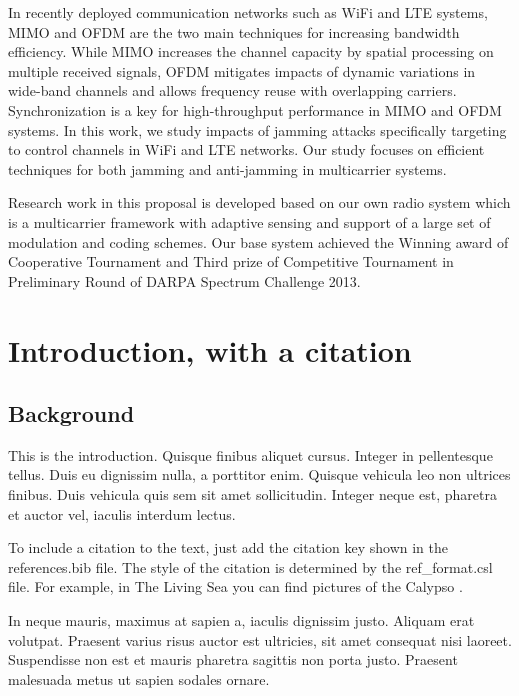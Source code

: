 \documentclass[11pt,letterpaper,]{article}
\begin{document}
{\begin{center}
\begin{minipage}{0.8\textwidth}
In recently deployed communication networks such as WiFi and LTE systems, MIMO and OFDM are the two main techniques for increasing bandwidth 
efficiency. While MIMO increases the channel capacity by spatial processing on multiple received signals, OFDM mitigates impacts of dynamic variations in wide-band channels and allows frequency reuse with overlapping carriers.
Synchronization is a key for high-throughput performance in MIMO and OFDM systems. In this work, we study impacts of jamming attacks 
specifically targeting to control channels in WiFi and LTE 
networks. Our study focuses on efficient techniques for both jamming and 
anti-jamming in multicarrier systems.

Research work in this proposal is developed based on our own radio system 
which is a multicarrier framework with adaptive sensing and support of a 
large set of modulation and coding schemes. Our base system achieved the 
Winning award of Cooperative Tournament and Third prize of Competitive 
Tournament in Preliminary Round of DARPA Spectrum Challenge 2013.
\end{minipage}
\end{center}}

\newpage

\tableofcontents
\newpage
{}

\section{Introduction, with a
citation}\label{introduction-with-a-citation}

\subsection{Background}\label{background}

This is the introduction. Quisque finibus aliquet cursus. Integer in
pellentesque tellus. Duis eu dignissim nulla, a porttitor enim. Quisque
vehicula leo non ultrices finibus. Duis vehicula quis sem sit amet
sollicitudin. Integer neque est, pharetra et auctor vel, iaculis
interdum lectus.

To include a citation to the text, just add the citation key shown in
the references.bib file. The style of the citation is determined by the
ref\_format.csl file. For example, in The Living Sea you can find
pictures of the Calypso \autocite{Cousteau1963}.

In neque mauris, maximus at sapien a, iaculis dignissim justo. Aliquam
erat volutpat. Praesent varius risus auctor est ultricies, sit amet
consequat nisi laoreet. Suspendisse non est et mauris pharetra sagittis
non porta justo. Praesent malesuada metus ut sapien sodales ornare.
\end{document}
